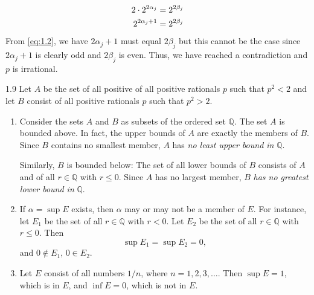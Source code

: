 \begin{example}
\begin{alignat}{2}
    	2\cdot 2^{2\alpha_j} &= 2^{2\beta_j}\notag\\
    	2^{2\alpha_j + 1} &= 2^{2\beta_j}\label{eq:1.2}
    \end{alignat}
    From \cref{eq:1.2}, we have \(2\alpha_j + 1\) must equal \(2\beta_j\) but this cannot be the case since 
    \(2\alpha_j + 1\) is clearly odd and \(2\beta_j\) is even. Thus, we have reached a contradiction and \(p\) is 
    irrational.
\item[1.9]
	Let \(A\) be the set of all positive of all positive rationals \(p\) such that \(p^2 < 2\) and let \(B\) consist of all 
	positive rationals \(p\) such that \(p^2 > 2\).
	\begin{enumerate}[label=\alph*.]
	\item
		Consider the sets \(A\) and \(B\) as subsets of the ordered set \(\mathbb{Q}\). The set \(A\) is bounded above. 
		In fact, the upper bounds of \(A\) are exactly the members of \(B\). Since \(B\) contains no smallest member,
		\(A\) has \textit{no least upper bound in} \(\mathbb{Q}\).
		\par\smallskip
		Similarly, \(B\) is bounded below: The set of all lower bounds of \(B\) consists of \(A\) and of all 
		\(r\in\mathbb{Q}\) with \(r\leq 0\). Since \(A\) has no largest member, \(B\) 
		\textit{has no greatest lower bound in} \(\mathbb{Q}\).
	\item
		If \(\alpha = \sup E\) exists, then \(\alpha\) may or may not be a member of \(E\). For instance, let \(E_1\) be
		the set of all \(r\in\mathbb{Q}\) with \(r < 0\). Let \(E_2\) be the set of all \(r\in\mathbb{Q}\) with \(r\leq 0\).
		Then
		\[
			\sup E_1 = \sup E_2 = 0,
		\]
		and \(0\not\in E_1\), \(0\in E_2\).
	\item
		Let \(E\) consist of all numbers \(1 / n\), where \(n = 1, 2, 3, \ldots\). Then \(\sup E = 1\), which is in \(E\), and
		\(\inf E = 0\), which is not in \(E\).
	\end{enumerate}
\end{example}